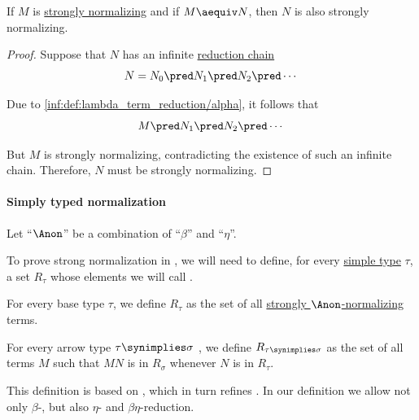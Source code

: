 \begin{proposition}\label{thm:strong_normalization_of_alpha_equivalent_term}
  If \( M \) is \hyperref[def:strongly_normalizing_lambda_term]{strongly normalizing} and if \( M \aequiv N \), then \( N \) is also strongly normalizing.
\end{proposition}
\begin{proof}
  Suppose that \( N \) has an infinite \hyperref[def:lambda_term_reduction_chain]{reduction chain}
  \begin{equation*}
    N = N_0 \pred N_1 \pred N_2 \pred \cdots
  \end{equation*}

  Due to \ref{inf:def:lambda_term_reduction/alpha}, it follows that
  \begin{equation*}
    M \pred N_1 \pred N_2 \pred \cdots
  \end{equation*}

  But \( M \) is strongly normalizing, contradicting the existence of such an infinite chain. Therefore, \( N \) must be strongly normalizing.
\end{proof}

\paragraph{Simply typed normalization}

\begin{definition}\label{def:strong_normalization_reducibility_candidate}
  Let \enquote{\( {\Anon} \)} be a combination of \enquote{\( \beta \)} and \enquote{\( \eta \)}.

  To prove strong normalization in , we will need to define, for every \hyperref[def:simple_type]{simple type} \( \tau \), a set \( R_\tau \) whose elements we will call .

  \begin{thmenum}
     For every base type \( \tau \), we define \( R_\tau \) as the set of all \hyperref[def:strongly_normalizing_lambda_term]{strongly \( \Anon \)-normalizing} terms.

     For every arrow type \( \tau \synimplies \sigma \) , we define \( R_{\tau \synimplies \sigma} \) as the set of all terms \( M \) such that \( MN \) is in \( R_\sigma \) whenever \( N \) is in \( R_\tau \).
  \end{thmenum}
\end{definition}
\begin{comments}
  \item This definition is based on \cite[172]{Mimram2020ProgramEqualsProof}, which in turn refines \cite[41]{GirardEtAl1989ProofsAndTypes}. In our definition we allow not only \( \beta \)-, but also \( \eta \)- and \( \beta\eta \)-reduction.
\end{comments}

